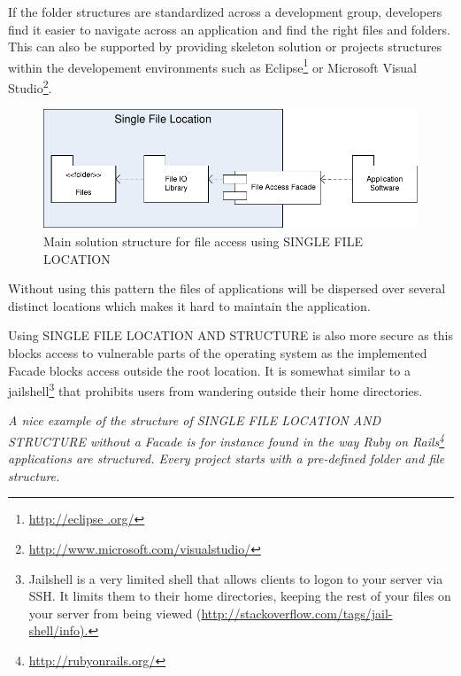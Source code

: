 If the folder structures are standardized across a development group, developers find it easier to navigate across an application and find the right files and folders. This can also be supported by providing skeleton solution or projects structures within the developement environments such as Eclipse\footnote{\url{http://eclipse	.org/}} or Microsoft Visual Studio\footnote{\url{http://www.microsoft.com/visualstudio/}}.

\begin{figure}[h!]
\centering
\includegraphics{patterns/singleFileLocationDiagram-02.pdf}
\caption{Main solution structure for file access using SINGLE FILE LOCATION}
\label{fig:singleFileLocationDiagram-02}
\end{figure}

Without using this pattern the files of applications will be dispersed over several distinct locations which makes it hard to maintain the application. 

Using SINGLE FILE LOCATION AND STRUCTURE is also more secure as this blocks access to vulnerable parts of the operating system as the implemented {\sc Facade} blocks access outside the root location. It is somewhat similar to a jailshell\footnote{Jailshell is a very limited shell that allows clients to logon to your server via SSH. It limits them to their home directories, keeping the rest of your files on your server from being viewed (\url{http://stackoverflow.com/tags/jail-shell/info).}} that prohibits users from wandering outside their home directories.

\textit{A nice example of the structure of SINGLE FILE LOCATION AND STRUCTURE without a {\sc Facade} is for instance found in the way Ruby on Rails\footnote{\url{http://rubyonrails.org/}} applications are structured. Every project starts with a pre-defined folder and file structure.}
 





